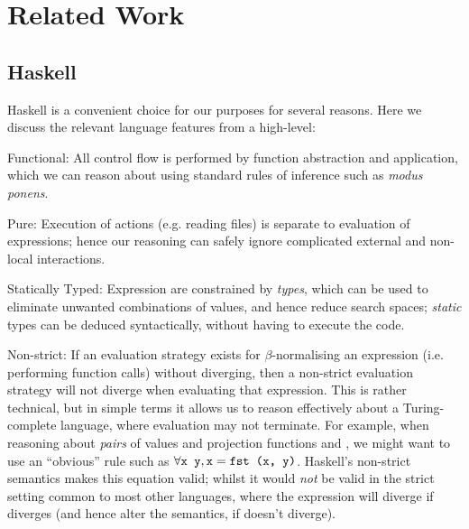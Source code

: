 \section{Related Work}
\label{sec:related}

\iffalse TODO: Talk about MuCheck \fi

\subsection{Haskell}
\label{sec:haskelldesc}

Haskell is a convenient choice for our purposes for several reasons. Here we discuss the relevant language features from a high-level:

\begin{description}

\item{Functional}: All control flow is performed by function abstraction and application, which we can reason about using standard rules of inference such as \emph{modus ponens}.

\item{Pure}: Execution of actions (e.g. reading files) is separate to evaluation of expressions; hence our reasoning can safely ignore complicated external and non-local interactions.

\item{Statically Typed}: Expression are constrained by \emph{types}, which can be used to eliminate unwanted combinations of values, and hence reduce search spaces; \emph{static} types can be deduced syntactically, without having to execute the code.

\item{Non-strict}: If an evaluation strategy exists for $\beta$-normalising an expression (i.e. performing function calls) without diverging, then a non-strict evaluation strategy will not diverge when evaluating that expression. This is rather technical, but in simple terms it allows us to reason effectively about a Turing-complete language, where evaluation may not terminate. For example, when reasoning about \emph{pairs} of values  and projection functions  and , we might want to use an ``obvious'' rule such as $\forall \text{\texttt{x y}}, \text{\texttt{x}} = \text{\texttt{fst (x, y)}}$. Haskell's non-strict semantics makes this equation valid; whilst it would \emph{not} be valid in the strict setting common to most other languages, where the expression  will diverge if  diverges (and hence alter the semantics, if  doesn't diverge).


\end{description}
